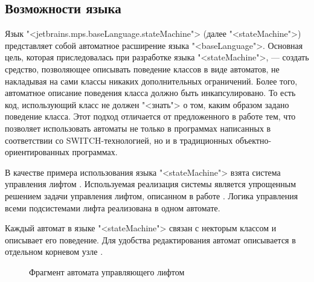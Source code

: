 \subsection{Возможности языка}
Язык "<jetbrains.mps.baseLanguage.stateMachine"> (далее "<stateMachine">) представляет собой автоматное расширение языка "<baseLanguage">. Основная цель, которая приследовалась при разработке языка "<stateMachine">, --- создать средство, позволяющее описывать поведение классов в виде автоматов, не накладывая на сами классы никаких дополнительных ограничений. Более того, автоматное описание поведения класса должно быть инкапсулировано. То есть код, использующий класс не должен "<знать"> о том, каким образом задано поведение класса. Этот подход отличается от предложенного в работе \cite{myUMLSwitchEclipse} тем, что позволяет использовать автоматы не только в программах написанных в соответствии со SWITCH-технологией, но и в традиционных объектно-ориентированных программах.

В качестве примера использования языка "<stateMachine"> взята система управления лифтом \cite{knuth}. Используемая реализация системы является упрощенным решением задачи управления лифтом, описанном в работе \cite{naumov}. Логика управления всеми подсистемами лифта реализована в одном автомате.

Каждый автомат в языке "<stateMachine"> связан с некторым классом и описывает его поведение. Для удобства редактирования автомат описывается в отдельном корневом узле \pic{\ref{fig:ElevatorStateMachine}}.

\begin{figure}
 \centering
 \caption{Фрагмент автомата управляющего лифтом}
 \label{fig:ElevatorStateMachine}
\end{figure}

